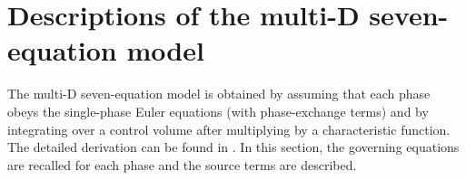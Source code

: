 \section{Descriptions of the multi-D seven-equation model}\label{sec:multi-seven-equ-model}

The multi-D seven-equation model is obtained by assuming that each phase obeys the single-phase Euler equations (with phase-exchange terms) and by integrating over a control volume after multiplying by a characteristic function. The detailed derivation can be found in \cite{SEM}. In this section, the governing equations are recalled for each phase and the source terms are described. 
